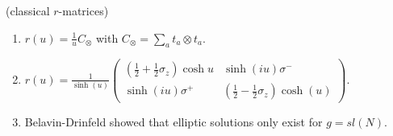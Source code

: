 \begin{example} (classical $r$-matrices)
\begin{enumerate}
	\item $r(u) = \frac{1}{u} C_\otimes$ with $C_\otimes = \sum_a t_a \otimes t_a$.
	\item $r(u) = \frac{1}{\sinh(u)} \begin{pmatrix} (\frac{1}{2} + \frac{1}{2} \sigma_z) \cosh u & \sinh(i u) \sigma^{-} \\ \sinh(i u) \sigma^+ & (\frac{1}{2} - \frac{1}{2} \sigma_z) \cosh(u) \end{pmatrix}$.
	\item Belavin-Drinfeld showed that elliptic solutions only exist for $g = sl(N)$.
\end{enumerate}
\end{example}
